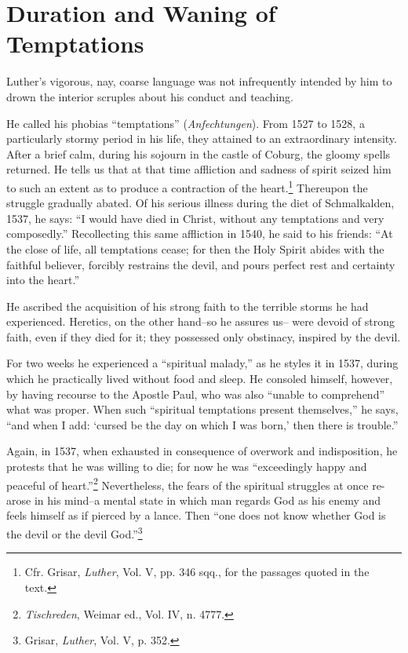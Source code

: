 \section{Duration and Waning of Temptations}

Luther’s vigorous, nay, coarse language was not infrequently intended
by him to drown the interior scruples about his conduct and
teaching.

He called his phobias “temptations” (\textit{Anfechtungen}). From 1527
to 1528, a particularly stormy period in his life, they attained to
an extraordinary intensity. After a brief calm, during his sojourn in
the castle of Coburg, the gloomy spells returned. He tells us that at
that time affliction and sadness of spirit seized him to such an extent
as to produce a contraction of the heart.\footnote
{Cfr. Grisar, \textit{Luther}, Vol. V, pp. 346 sqq., for the passages quoted in the text.}
Thereupon the struggle
gradually abated. Of his serious illness during the diet of Schmalkalden,
1537, he says: “I would have died in Christ, without any
temptations and very composedly.” Recollecting this same affliction
in 1540, he said to his friends: “At the close of life, all temptations
cease; for then the Holy Spirit abides with the faithful believer, forcibly
restrains the devil, and pours perfect rest and certainty into the
heart.”

He ascribed the acquisition of his strong faith to the terrible storms
he had experienced. Heretics, on the other hand--so he assures us--
were devoid of strong faith, even if they died for it; they possessed
only obstinacy, inspired by the devil.

For two weeks he experienced a “spiritual malady,” as he styles it in
1537, during which he practically lived without food and sleep. He
consoled himself, however, by having recourse to the Apostle Paul,
who was also “unable to comprehend” what was proper. When such
“spiritual temptations present themselves,” he says, “and when I
add: ‘cursed be the day on which I was born,’ then there is trouble.”

Again, in 1537, when exhausted in consequence of overwork and
indisposition, he protests that he was willing to die; for now he was
“exceedingly happy and peaceful of heart.”\footnote{\textit{Tischreden}, Weimar ed., Vol. IV, n. 4777.}
Nevertheless, the fears
of the spiritual struggles at once re-arose in his mind--a mental
state in which man regards God as his enemy and feels himself as if
pierced by a lance. Then “one does not know whether God is the
devil or the devil God.”\footnote{Grisar, \textit{Luther}, Vol. V, p. 352.}

